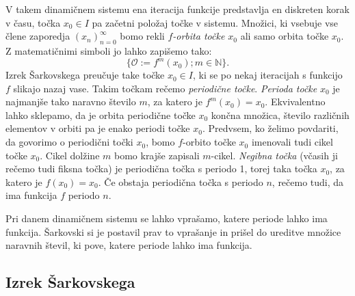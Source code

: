 \documentclass[mat2]{fmfdelo}
\newcommand{\N}{\mathbb N}
\begin{document}
V takem dinamičnem sistemu ena iteracija funkcije predstavlja en diskreten korak v času, točka $x_0 \in I$ pa začetni položaj točke v sistemu. Množici, ki vsebuje vse člene zaporedja $\left( x_n \right)_{n=0}^{\infty}$ bomo rekli \emph{$f$-orbita točke $x_0$} ali samo orbita točke $x_0$. Z matematičnimi simboli jo lahko zapišemo tako:
$$\{ \mathcal{O} := f^m(x_0) ; m \in \N \}.$$
Izrek Šarkovskega preučuje take točke $x_0 \in I$, ki se po nekaj iteracijah s funkcijo $f$ slikajo nazaj vase. Takim točkam rečemo \emph{periodične točke}. \emph{Perioda točke} $x_0$ je najmanjše tako naravno število $m$, za katero je $f^m(x_0) = x_0$. Ekvivalentno lahko sklepamo, da je orbita periodične točke $x_0$ končna množica, število različnih elementov v orbiti pa je enako periodi točke $x_0$. Predvsem, ko želimo povdariti, da govorimo o periodični točki $x_0$, bomo $f$-orbito točke $x_0$ imenovali tudi cikel točke $x_0$. Cikel dolžine $m$ bomo krajše zapisali $m$-cikel. \emph{Negibna točka} (včasih ji rečemo tudi fiksna točka) je periodična točka s periodo 1, torej taka točka $x_0$, za katero je $f(x_0) = x_0$. Če obstaja periodična točka s periodo $n$, rečemo tudi, da ima funkcija $f$ periodo $n$.

Pri danem dinamičnem sistemu se lahko vprašamo, katere periode lahko ima funkcija. Šarkovski si je postavil prav to vprašanje in prišel do ureditve množice naravnih števil, ki pove, katere periode lahko ima funkcija.

\subsection{Izrek Šarkovskega}
\end{document}
